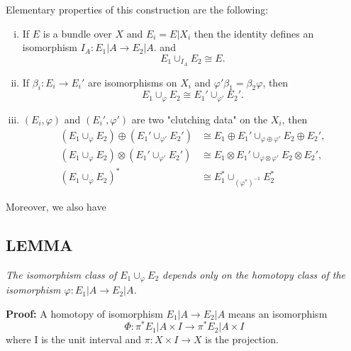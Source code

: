 Elementary properties of this construction are the following:
\begin{enumerate}[(i)]
    \item If $E$ is a bundle over $X$ and $E_i = E \vert X_i$ then the identity defines an isomorphism $I_A: E_1 \vert A \to E_2 \vert A$. and
    \begin{equation*}
        E_1 \cup_{I_A} E_2 \cong E.
    \end{equation*}
    \item If $\beta_i: E_i \to E_i'$ are isomorphisms on $X_i$ and $\varphi'\beta_1 = \beta_2\varphi$, then
    \begin{equation*}
        E_1 \cup_\varphi E_2 \cong  E_1' \cup_{\varphi'} E_2'.
    \end{equation*}
    \item $(E_i, \varphi)$ and $(E_i', \varphi')$ are two "clutching data" on the $X_i$, then
    \begin{align*}
        (E_1 \cup_\varphi E_2) \oplus (E_1' \cup_{\varphi'} E_2') &\cong E_1 \oplus E_1' \cup_{\varphi \oplus \varphi'} E_2 \oplus E_2', \\
        (E_1 \cup_\varphi E_2) \otimes (E_1' \cup_{\varphi'} E_2') &\cong E_1 \otimes E_1' \cup_{\varphi \otimes \varphi'} E_2 \otimes E_2', \\
        (E_1 \cup_\varphi E_2)^* &\cong E_1^* \cup_{(\varphi^*)^{-1}} E_2^*
    \end{align*}
\end{enumerate}

Moreover, we also have

\subsection{LEMMA}\label{lem:1.4.6} \textit{The isomorphism class of $E_1 \cup_\varphi E_2$ depends only on the homotopy class of the isomorphism $\varphi: E_1 \vert A \to E_2 \vert A$.} \par 

\textbf{Proof:} A homotopy of isomorphism $E_1 \vert A \to E_2 \vert A$ means an isomorphism
\begin{equation*}
    \Phi: \pi^* E_1 \vert A \times I \to \pi^* E_2 \vert A \times I
\end{equation*}
where I is the unit interval and $\pi: X \times I \to X$ is the projection. \par 

